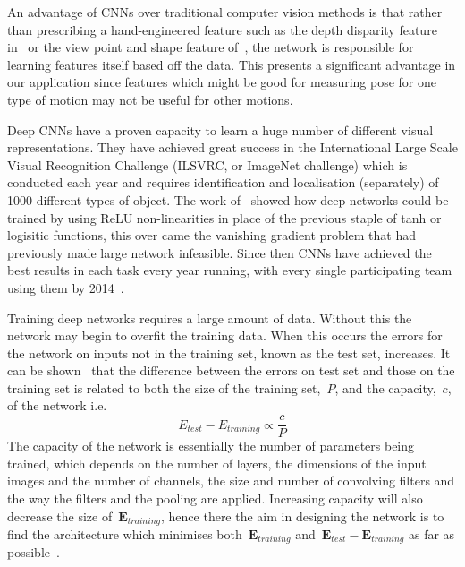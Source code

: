 \documentclass[11pt]{article} %
\begin{document}
An advantage of CNNs over traditional computer vision methods is that rather than prescribing a hand-engineered feature such as the depth disparity feature in~\cite{Shotton2011} or the view point and shape feature of~\cite{Chan2014}, the network is responsible for learning features itself based off the data. This presents a significant advantage in our application since features which might be good for measuring pose for one type of motion may not be useful for other motions. %

Deep CNNs have a proven capacity to learn a huge number of different visual representations. They have achieved great success in the International Large Scale Visual Recognition Challenge (ILSVRC, or ImageNet challenge) which is conducted each year and requires identification and localisation (separately) of 1000 different types of object. The work of~\cite{Krizhevsky2012} showed how deep networks could be trained by using ReLU non-linearities in place of the previous staple of tanh or logisitic functions, this over came the vanishing gradient problem that had previously made large network infeasible. Since then CNNs have achieved the best results in each task every year running, with every single participating team using them by 2014~\cite{Russakovsky}.

Training deep networks requires a large amount of data. Without this the network may begin to overfit the training data. When this occurs the errors for the network on inputs not in the training set, known as the test set, increases. It can be shown~\cite{Seung1992,Vapnik1994} that the difference between the errors on test set and those on the training set is related to both the size of the training set,~$P$, and the capacity,~$c$,  of the network i.e. 
\begin{equation}
E_{test}-E_{training} \propto \frac{c}{P}
\label{eq:errorCap}
\end{equation}
The capacity of the network is essentially the number of parameters being trained, which depends on the number of layers, the dimensions of the input images and the number of channels, the size and number of convolving filters and the way the filters and the pooling are applied. Increasing capacity will also decrease the size of~$\boldsymbol{E}_{training}$, hence there the aim in designing the network is to find the architecture which minimises both~$\boldsymbol{E}_{training}$ and~$\boldsymbol{E}_{test}-\boldsymbol{E}_{training}$ as far as possible~\cite{LeCun1998}.
\end{document}
